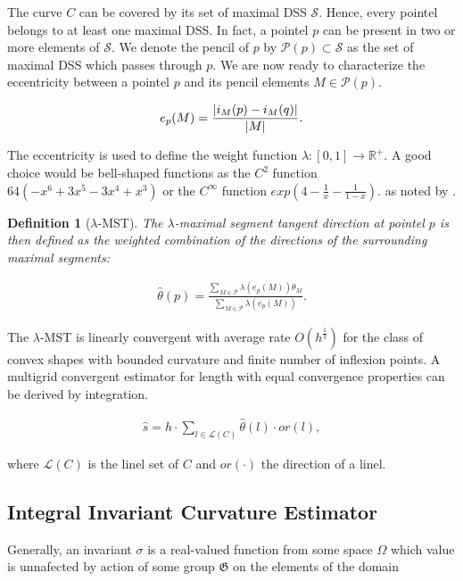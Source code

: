 \documentclass[runningheads]{llncs}
\newtheorem{ddef}{Definition}
\DeclarePairedDelimiter\abs{\lvert}{\rvert}%
\begin{document}
The curve $C$ can be covered by its set of maximal DSS $\mathcal{S}$. Hence, every pointel belongs to at least one maximal DSS. In fact, a pointel $p$ can be present in two or more elements of $\mathcal{S}$. We denote the pencil of $p$ by $\mathcal{P}(p) \subset \mathcal{S}$ as the set of maximal DSS which passes through $p$. We are now ready to characterize the eccentricity between a pointel $p$ and its pencil elements $M \in \mathcal{P}(p)$.

\begin{align*}
	e_p(M) = \frac{\abs{i_M(p) - i_M(q)} }{\abs{M}}. 
\end{align*}

The eccentricity is used to define the weight function $\lambda:[0,1]\rightarrow \mathbb{R}^+$. A good choice would be bell-shaped functions as the $C^2$ function $64(-x^6 + 3x^5 - 3x^4 + x^3)$ or the $C^{\infty}$ function $exp(4 - \frac{1}{x} - \frac{1}{1-x}).$ as noted by \cite{lachaud07}.

\begin{ddef}[$\lambda$-MST] 
The $\lambda$-maximal segment tangent direction at pointel $p$ is then defined as the weighted combination of the directions of the surrounding maximal segments:
\end{ddef}

\begin{align*}
	\hat{\theta}(p) = \frac{ \sum_{M \in \mathcal{P}}{\lambda( e_p(M) )}\theta_M }{\sum_{M \in \mathcal{P}}{\lambda( e_p(M) )}}.
\end{align*}

The $\lambda$-MST is linearly convergent with average rate $O(h^{\frac{1}{3}})$ for the class of convex shapes with bounded curvature and finite number of inflexion points. A multigrid convergent estimator for length with equal convergence properties can be derived by integration.

\begin{align*}
	\hat{s} = h \cdot \sum_{l \in \mathcal{L}(C)}{\hat{\theta}(l) \cdot or(l)},
\end{align*}

where $\mathcal{L}(C)$ is the linel set of $C$ and $or(\cdot)$ the direction of a linel.


\subsection{Integral Invariant Curvature Estimator}
Generally, an invariant $\sigma$ is a real-valued function from some space $\Omega$ which value is unnafected by action of some group $\mathfrak{G}$ on the elements of the domain
		
\end{document}
